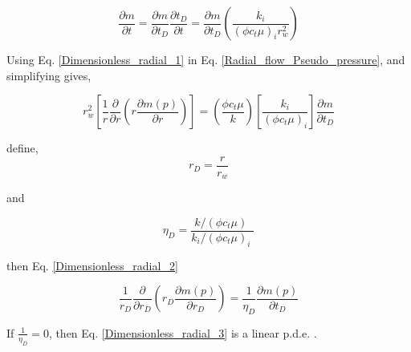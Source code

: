 \documentclass{llncs}
\numberwithin{equation}{section}
\numberwithin{figure}{section}
\numberwithin{table}{section}
\begin{document}
    \begin{equation}
        \frac{\partial m}{\partial t}=\frac{\partial m}{\partial {{t}_{D}}}\frac{\partial {{t}_{D}}}{\partial t}=\frac{\partial m}{\partial {{t}_{D}}}\left( \frac{{{k}_{i}}}{{{\left( \phi {{c}_{t}}\mu  \right)}_{i}}r_{w}^{2}} \right)
        \label{Dimensionless_radial_1}
    \end{equation}     
    
    Using Eq. \ref{Dimensionless_radial_1} in Eq. \ref{Radial_flow_Pseudo_pressure}, and simplifying gives,
    
    \begin{equation}
        r_{w}^{2}\left[ \frac{1}{r}\frac{\partial }{\partial r}\left( r\frac{\partial m\left( p \right)}{\partial r} \right) \right]=\left( \frac{\phi {{c}_{t}}\mu }{k} \right)\left[ \frac{{{k}_{i}}}{{{\left( \phi {{c}_{t}}\mu  \right)}_{i}}} \right]\frac{\partial m}{\partial {{t}_{D}}}
        \label{Dimensionless_radial_2}
    \end{equation}      
    
     define,
    \begin{equation}    
        {{r}_{D}}=\frac{r}{{{r}_{w}}}
        \label{Dimensionless_lenght}
    \end{equation}    
    
    and 
    
    \begin{equation}
        {{\eta }_{D}}=\frac{{k}/{\left( \phi {{c}_{t}}\mu  \right)}\;}{{{{k}_{i}}}/{{{\left( \phi {{c}_{t}}\mu  \right)}_{i}}}\;}
        \label{Dimensionless_diffusivity}
    \end{equation}        
    
    then Eq. \ref{Dimensionless_radial_2} 
    
    \begin{equation}
        \frac{1}{{{r}_{D}}}\frac{\partial }{\partial {{r}_{D}}}\left( {{r}_{D}}\frac{\partial m\left( p \right)}{\partial {{r}_{D}}} \right)=\frac{1}{{{\eta }_{D}}}\frac{\partial m\left( p \right)}{\partial {{t}_{D}}}
        \label{Dimensionless_radial_3}
    \end{equation}       
    
    If $\frac{1}{{{\eta }_{D}}}=0$, then Eq. \ref{Dimensionless_radial_3} is a linear p.d.e. .
    
\end{document}
